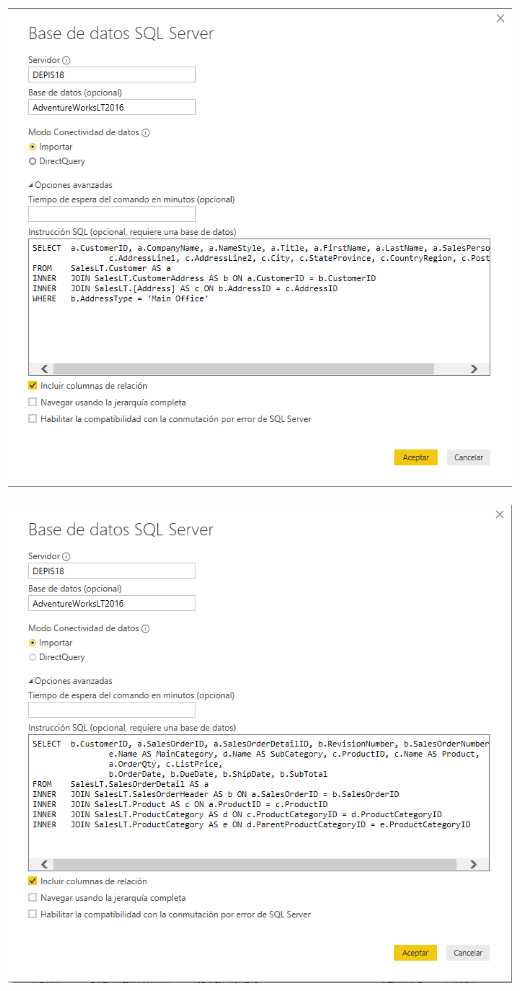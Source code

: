 \begin{itemize}
\begin{enumerate}
\begin{center}
\includegraphics[scale=0.55]{./Imagenes/tarea1_2.png}
\end{center}

\begin{center}
\includegraphics[scale=0.55]{./Imagenes/tarea1_3.png}
\end{center}
\end{enumerate}


\end{itemize}
